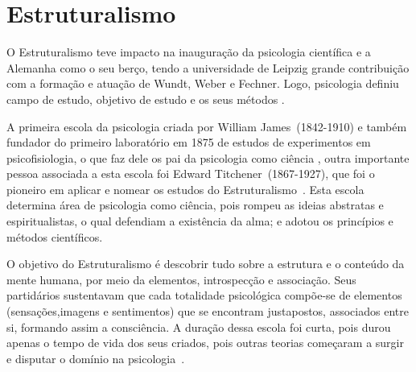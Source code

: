 \section{Estruturalismo}\label{estruturalismo}

O Estruturalismo teve impacto na inauguração da psicologia científica e a Alemanha como o seu berço, tendo a universidade de Leipzig grande contribuição com a formação e atuação de Wundt, Weber e Fechner.
Logo, psicologia definiu campo de estudo, objetivo de estudo e os seus métodos \cite{bock1999psicologias}. 

A primeira escola da psicologia criada por William James~(1842-1910) e também fundador do primeiro laboratório em 1875 de estudos de experimentos em psicofisiologia, o que faz dele os pai da psicologia como ciência , outra importante pessoa associada a esta escola foi Edward Titchener~(1867-1927), que foi o pioneiro em aplicar e nomear os estudos do Estruturalismo~\cite{bock1999psicologias}. 
Esta escola determina área de psicologia como ciência, pois rompeu as ideias abstratas e espiritualistas, o qual defendiam a existência da alma; e adotou os princípios e métodos científicos. 

O objetivo do Estruturalismo é descobrir tudo sobre a estrutura e o conteúdo da mente humana, por meio da elementos, introspecção e associação.
Seus partidários sustentavam que cada totalidade psicológica compõe-se de elementos (sensações,imagens e sentimentos) que se encontram justapostos, associados entre si, formando assim a consciência.
A duração dessa escola foi curta, pois durou apenas o tempo de vida dos seus criados, pois outras teorias começaram a surgir e disputar o domínio na psicologia~\cite{silva2007psicologia_educacao}.  

